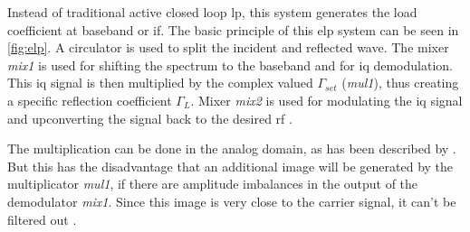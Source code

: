 \documentclass[12pt,a4paper,parskip=full,abstract=true,BCOR=10mm,twoside,open=right]{scrreprt}
\def\device#1{\textit{#1}}
\begin{document}
Instead of traditional active closed loop \gls{lp}, this system generates the
load coefficient at baseband or \gls{if}. The basic principle of this \gls{elp} system
can be seen in \cref{fig:elp}. A circulator is used to split the incident and
reflected wave. The mixer \device{mix1} is used for shifting the spectrum to
the baseband and for \gls{iq} demodulation. This \gls{iq} signal is then
multiplied by the complex valued $\Gamma_{set}$ (\device{mul1}), thus creating a specific
reflection coefficient $\Gamma_L$. Mixer \device{mix2} is used for modulating
the \gls{iq} signal and upconverting the signal back to the desired \gls{rf} \cite{williams_experimental_2005}.

The multiplication can be done in the analog domain, as has been described
by \cite{williams_experimental_2005}. But this has the disadvantage that
an additional image will be generated by the multiplicator \device{mul1},
if there are amplitude imbalances in the output
of the demodulator \device{mix1}. Since this image is very close to the
carrier signal, it can't be filtered out \cite{hashmi_agile_2010}.
\end{document}
